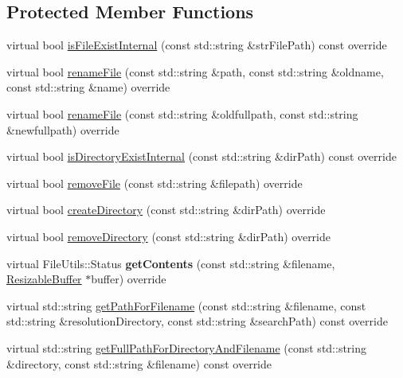 \subsection*{Protected Member Functions}
\begin{DoxyCompactItemize}
\item 
virtual bool \hyperlink{classFileUtilsWin32_ab3538e3fa4418afbff4e95858a553ff7}{is\+File\+Exist\+Internal} (const std\+::string \&str\+File\+Path) const override
\item 
virtual bool \hyperlink{classFileUtilsWin32_a209167c25ca47a1d03d47522cb88dc00}{rename\+File} (const std\+::string \&path, const std\+::string \&oldname, const std\+::string \&name) override
\item 
virtual bool \hyperlink{classFileUtilsWin32_ac583dacdd0e02e0a92d32a31ba8f8d51}{rename\+File} (const std\+::string \&oldfullpath, const std\+::string \&newfullpath) override
\item 
virtual bool \hyperlink{classFileUtilsWin32_a9a408c75230da1289e5619285dd00f67}{is\+Directory\+Exist\+Internal} (const std\+::string \&dir\+Path) const override
\item 
virtual bool \hyperlink{classFileUtilsWin32_aab51310dbc155b73cb9f3d4f3a918d36}{remove\+File} (const std\+::string \&filepath) override
\item 
virtual bool \hyperlink{classFileUtilsWin32_a6385e7d4763147cff2c158974d16adf8}{create\+Directory} (const std\+::string \&dir\+Path) override
\item 
virtual bool \hyperlink{classFileUtilsWin32_a50a9cd9c6a65e4a3c33d188ac78b8a74}{remove\+Directory} (const std\+::string \&dir\+Path) override
\item 
\mbox{\label{classFileUtilsWin32_a8e913f7b14a349db8613fe02809eba3e}} 
virtual File\+Utils\+::\+Status {\bfseries get\+Contents} (const std\+::string \&filename, \hyperlink{classResizableBuffer}{Resizable\+Buffer} $\ast$buffer) override
\item 
virtual std\+::string \hyperlink{classFileUtilsWin32_a1a2b675bb9e51acc264bf1683a2c1a99}{get\+Path\+For\+Filename} (const std\+::string \&filename, const std\+::string \&resolution\+Directory, const std\+::string \&search\+Path) const override
\item 
virtual std\+::string \hyperlink{classFileUtilsWin32_a32e9d4ce94fa867563c2649bbb6a8416}{get\+Full\+Path\+For\+Directory\+And\+Filename} (const std\+::string \&directory, const std\+::string \&filename) const override

\end{DoxyCompactItemize}

